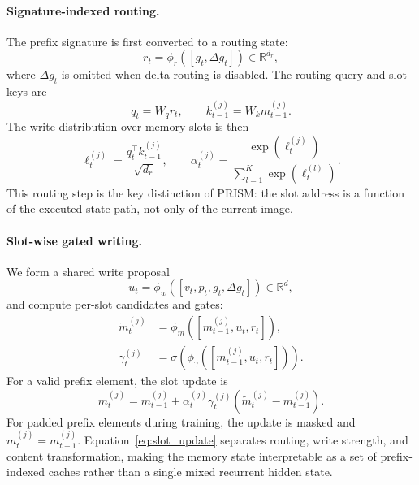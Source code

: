 \paragraph{Signature-indexed routing.}
The prefix signature is first converted to a routing state:
\begin{equation}
    r_t = \phi_r([g_t,\Delta g_t]) \in \mathbb{R}^{d_r},
    \label{eq:route_state}
\end{equation}
where $\Delta g_t$ is omitted when delta routing is disabled. The routing query
and slot keys are
\begin{equation}
    q_t = W_q r_t, \qquad
    k_{t-1}^{(j)} = W_k m_{t-1}^{(j)}.
\end{equation}
The write distribution over memory slots is then
\begin{equation}
    \ell_t^{(j)}
    =
    \frac{q_t^\top k_{t-1}^{(j)}}{\sqrt{d_r}},
    \qquad
    \alpha_t^{(j)}
    =
    \frac{\exp(\ell_t^{(j)})}{\sum_{l=1}^{K}\exp(\ell_t^{(l)})}.
    \label{eq:slot_routing}
\end{equation}
This routing step is the key distinction of PRISM: the slot address is a
function of the executed state path, not only of the current image.

\paragraph{Slot-wise gated writing.}
We form a shared write proposal
\begin{equation}
    u_t = \phi_w([v_t,p_t,g_t,\Delta g_t]) \in \mathbb{R}^d,
    \label{eq:write_base}
\end{equation}
and compute per-slot candidates and gates:
\begin{align}
    \tilde m_t^{(j)}
    &=
    \phi_m([m_{t-1}^{(j)},u_t,r_t]),
    \\
    \gamma_t^{(j)}
    &=
    \sigma\!\left(\phi_{\gamma}([m_{t-1}^{(j)},u_t,r_t])\right).
\end{align}
For a valid prefix element, the slot update is
\begin{equation}
    m_t^{(j)}
    =
    m_{t-1}^{(j)}
    +
    \alpha_t^{(j)}\gamma_t^{(j)}
    \left(\tilde m_t^{(j)} - m_{t-1}^{(j)}\right).
    \label{eq:slot_update}
\end{equation}
For padded prefix elements during training, the update is masked and
$m_t^{(j)}=m_{t-1}^{(j)}$. Equation~\eqref{eq:slot_update} separates routing,
write strength, and content transformation, making the memory state
interpretable as a set of prefix-indexed caches rather than a single mixed
recurrent hidden state.

